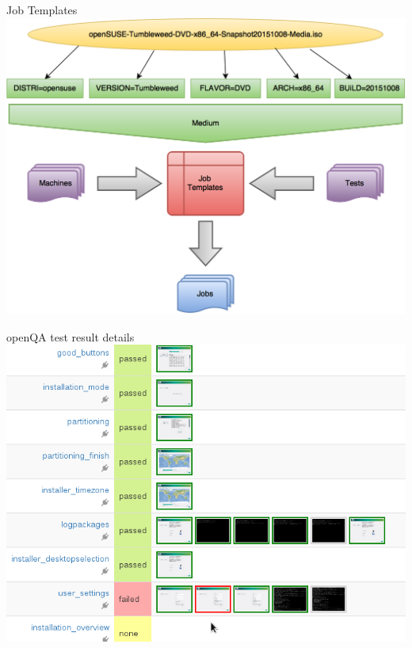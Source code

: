 \documentclass[
]{beamer}
\begin{document}
\begin{frame}{Job Templates}
  \includegraphics[width=.8\paperwidth]{jobtemplates}
\end{frame}

%

\begin{frame}{openQA test result details }
  \includegraphics[width=.8\paperwidth]{openqa-fail5.png}
\end{frame}
\end{document}
